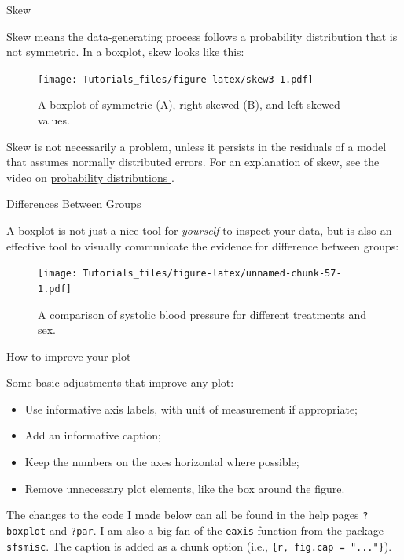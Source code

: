 \documentclass[
]{book}
\providecommand{\tightlist}{%
  \setlength{\itemsep}{0pt}\setlength{\parskip}{0pt}}
\begin{document}
Skew

Skew means the data-generating process follows a probability distribution that is not symmetric. In a boxplot, skew looks like this:

\begin{figure}
\centering
\texttt{[image: Tutorials\_files/figure-latex/skew3-1.pdf]}
\caption{\label{fig:skew3}A boxplot of symmetric (A), right-skewed (B), and left-skewed values.}
\end{figure}

Skew is not necessarily a problem, unless it persists in the residuals of a model that assumes normally distributed errors. For an explanation of skew, see the video on \href{https://youtu.be/jdfG7rKPVNk}{probability distributions }.

Differences Between Groups

A boxplot is not just a nice tool for \emph{yourself} to inspect your data, but is also an effective tool to visually communicate the evidence for difference between groups:

\begin{figure}
\centering
\texttt{[image: Tutorials\_files/figure-latex/unnamed-chunk-57-1.pdf]}
\caption{\label{fig:unnamed-chunk-57}A comparison of systolic blood pressure for different treatments and sex.}
\end{figure}

How to improve your plot

Some basic adjustments that improve any plot:

\begin{itemize}
\tightlist
\item
  Use informative axis labels, with unit of measurement if appropriate;
\item
  Add an informative caption;
\item
  Keep the numbers on the axes horizontal where possible;
\item
  Remove unnecessary plot elements, like the box around the figure.
\end{itemize}

The changes to the code I made below can all be found in the help pages \texttt{?boxplot} and \texttt{?par}. I am also a big fan of the \texttt{eaxis} function from the package \texttt{sfsmisc}. The caption is added as a chunk option (i.e., \texttt{\textasciigrave{}\textasciigrave{}\textasciigrave{}\{r,\ fig.cap\ =\ "..."\}}).
\end{document}
